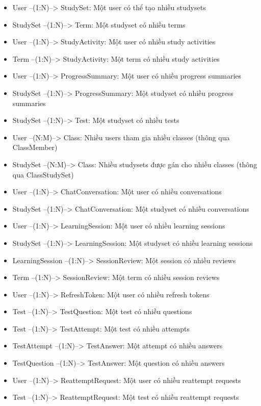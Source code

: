 \documentclass[../DoAn.tex]{subfiles}
\begin{document}
\begin{itemize}
    \item User --(1:N)--> StudySet: Một user có thể tạo nhiều studysets
    \item StudySet --(1:N)--> Term: Một studyset có nhiều terms
    \item User --(1:N)--> StudyActivity: Một user có nhiều study activities
    \item Term --(1:N)--> StudyActivity: Một term có nhiều study activities
    \item User --(1:N)--> ProgressSummary: Một user có nhiều progress summaries
    \item StudySet --(1:N)--> ProgressSummary: Một studyset có nhiều progress summaries
    \item StudySet --(1:N)--> Test: Một studyset có nhiều tests
    \item User --(N:M)--> Class: Nhiều users tham gia nhiều classes (thông qua ClassMember)
    \item StudySet --(N:M)--> Class: Nhiều studysets được gán cho nhiều classes (thông qua ClassStudySet)
    \item User --(1:N)--> ChatConversation: Một user có nhiều conversations
    \item StudySet --(1:N)--> ChatConversation: Một studyset có nhiều conversations
    \item User --(1:N)--> LearningSession: Một user có nhiều learning sessions
    \item StudySet --(1:N)--> LearningSession: Một studyset có nhiều learning sessions
    \item LearningSession --(1:N)--> SessionReview: Một session có nhiều reviews
    \item Term --(1:N)--> SessionReview: Một term có nhiều session reviews
    \item User --(1:N)--> RefreshToken: Một user có nhiều refresh tokens
    \item Test --(1:N)--> TestQuestion: Một test có nhiều questions
    \item Test --(1:N)--> TestAttempt: Một test có nhiều attempts
    \item TestAttempt --(1:N)--> TestAnswer: Một attempt có nhiều answers
    \item TestQuestion --(1:N)--> TestAnswer: Một question có nhiều answers
    \item User --(1:N)--> ReattemptRequest: Một user có nhiều reattempt requests
    \item Test --(1:N)--> ReattemptRequest: Một test có nhiều reattempt requests
\end{itemize}
\end{document}
